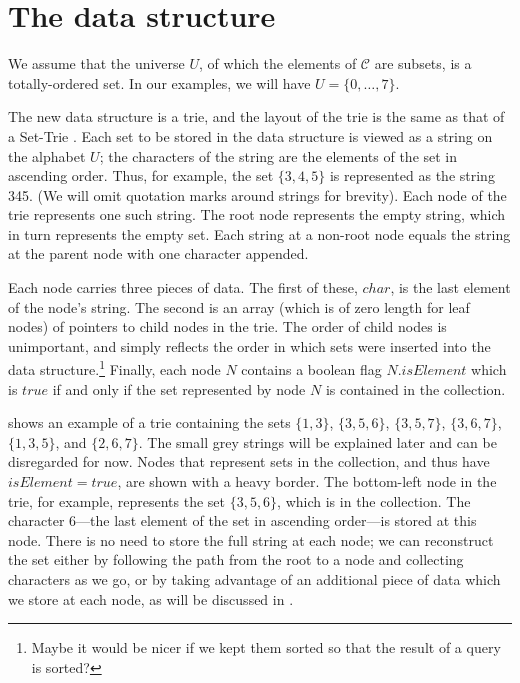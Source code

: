 \section{The data structure}

We assume that the universe $U$, of which the elements of $\mathcal{C}$ are
subsets, is a totally-ordered set.  In our examples, we will have $U = \{0, \dots, 7\}$.

The new data structure is a trie, and the layout of the trie is the same as
that of a Set-Trie \cite{DBLP:conf/IEEEares/Savnik13}.  Each set to be stored
in the data structure is viewed as a
string on the alphabet $U$; the characters of the string are the
elements of the set in ascending order.  Thus, for example, the set $\{3,4,5\}$ is
represented as the string 345.  (We will omit quotation marks around strings
for brevity).  Each node of the trie
represents one such string. The root node represents the empty string,
which in turn represents the empty set.  Each string at a non-root node equals the string at
the parent node with one character appended.

Each node carries three pieces of data.  The first of these, $\mathit{char}$,
is the last element of the node's string.  The second is an array (which is of
zero length for leaf nodes) of pointers to child nodes in the trie. The order
of child nodes is unimportant, and simply reflects the order in which sets were
inserted into the data structure.\footnote{Maybe it would be nicer if we kept
them sorted so that the result of a query is sorted?} Finally, each node $N$
contains a boolean flag $N.\mathit{isElement}$ which is $\mathit{true}$ if
and only if the set represented by node $N$ is contained in the collection.

 shows an example of a trie containing the sets
$\{1,3\}$,
$\{3,5,6\}$,
$\{3,5,7\}$,
$\{3,6,7\}$,
$\{1,3,5\}$, and
$\{2,6,7\}$.  The small grey strings will be explained later and can be disregarded
for now.  Nodes that represent sets in the collection, and thus have $\mathit{isElement}=\mathit{true}$,
    are shown with a heavy border.
The bottom-left node in the trie, for example, represents the set $\{3,5,6\}$, which is in the
collection.  The character 6---the last element of the set in ascending order---is
stored at this node.  There is no need to store the full string at each node; we can
reconstruct the set either by following the path from the root to a node and collecting
characters as we go, or by taking advantage of an additional piece of data which we store
at each node, as will be discussed in .

